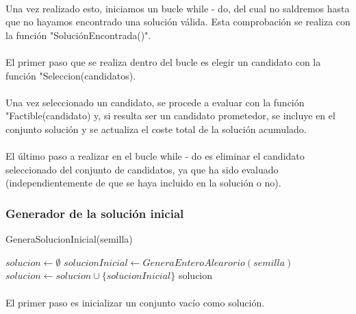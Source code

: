 \documentclass{article}
\begin{document}
		\paragraph{}Una vez realizado esto, iniciamos un bucle while - do, del cual no saldremos hasta que no hayamos encontrado una solución válida. Esta comprobación se realiza con la función "SoluciónEncontrada()".
		
		\paragraph{}El primer paso que se realiza dentro del bucle es elegir un candidato con la función "Seleccion(candidatos).
		
		\paragraph{}Una vez seleccionado un candidato, se procede a evaluar con la función "Factible(candidato) y, si resulta ser un candidato prometedor, se incluye en el conjunto solución y se actualiza el coste total de la solución acumulado.
		
		\paragraph{}El último paso a realizar en el bucle while - do es eliminar el candidato seleccionado del conjunto de candidatos, ya que ha sido evaluado (independientemente de que se haya incluido en la solución o no).
	
	

	\subsubsection{Generador de la solución inicial}
		\begin{algorithm}[H]
			\caption{GeneraSolucionInicial(semilla)}
			\begin{algorithmic}
				\STATE $solucion \leftarrow \emptyset$
				\STATE $solucionInicial \leftarrow GeneraEnteroAlearorio(semilla)$
				\STATE $solucion \leftarrow solucion \cup \{solucionInicial\}$
				\RETURN solucion
			\end{algorithmic}
		\end{algorithm}
	
		\paragraph{}El primer paso es inicializar un conjunto vacío como solución.
			
\end{document}

